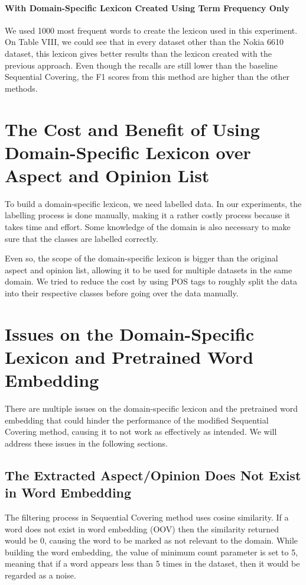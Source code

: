 \documentclass[a4paper,conference]{IEEEtran}
\begin{document}
\paragraph{With Domain-Specific Lexicon Created Using Term Frequency Only}
We used 1000 most frequent words to create the lexicon used in this experiment. On Table VIII, we could see that in every dataset other than the Nokia 6610 dataset, this lexicon gives better results than the lexicon created with the previous approach. Even though the recalls are still lower than the baseline Sequential Covering, the F1 scores from this method are higher than the other methods.

\section{The Cost and Benefit of Using Domain-Specific Lexicon over Aspect and Opinion List}
To build a domain-specific lexicon, we need labelled data. In our experiments, the labelling process is done manually, making it a rather costly process because it takes time and effort. Some knowledge of the domain is also necessary to make sure that the classes are labelled correctly.

Even so, the scope of the domain-specific lexicon is bigger than the original aspect and opinion list, allowing it to be used for multiple datasets in the same domain. We tried to reduce the cost by using POS tags to roughly split the data into their respective classes before going over the data manually.

\section{Issues on the Domain-Specific Lexicon and Pretrained Word Embedding}
There are multiple issues on the domain-specific lexicon and the pretrained word embedding that could hinder the performance of the modified Sequential Covering method, causing it to not work as effectively as intended. We will address these issues in the following sections.

\subsection{The Extracted Aspect/Opinion Does Not Exist in Word Embedding}
The filtering process in Sequential Covering method uses cosine similarity. If a word does not exist in word embedding (OOV) then the similarity returned would be 0, causing the word to be marked as not relevant to the domain. While building the word embedding, the value of minimum count parameter is set to 5, meaning that if a word appears less than 5 times in the dataset, then it would be regarded as a noise.
\end{document}
